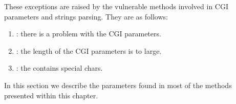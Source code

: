 \documentclass{ozdoc}
\begin{document}
\label{SUBSECTION.CGIEXCEPTIONS}



  \mozartEMPTY
These exceptions are raised by the vulnerable methods involved in CGI parameters and  strings parsing. They are as follows: \mozartEMPTY
\begin{enumerate}
\item{} : there is a problem with the CGI parameters. 
\item{} : the length of the CGI parameters is to large.
\item{} : the  contains special chars.
\end{enumerate}


\label{SECTION.INOUTPRMS}



In this section we describe the parameters found in most of the methods presented within this chapter.   \mozartEMPTY


\label{SUBSECTION.INPRMS}
\end{document}
